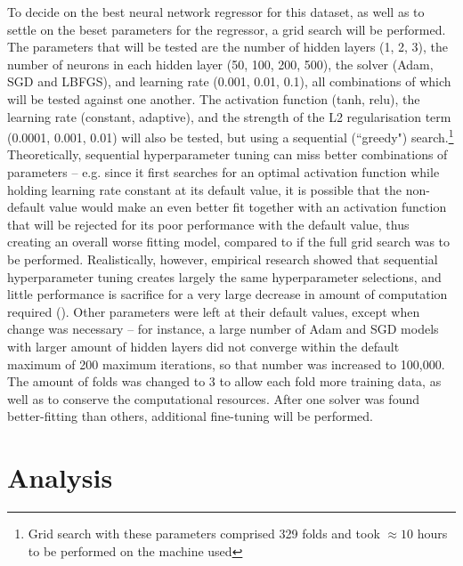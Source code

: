 \documentclass[12pt]{report}
\begin{document}
To decide on the best neural network regressor for this dataset, as well as to settle on the beset parameters for the regressor, a grid search will be performed. The parameters that will be tested are the number of hidden layers (1, 2, 3), the number of neurons in each hidden layer (50, 100, 200, 500), the solver (Adam, SGD and LBFGS), and learning rate (0.001, 0.01, 0.1), all combinations of which will be tested against one another. The activation function (tanh, relu), the learning rate (constant, adaptive), and the strength of the L2 regularisation term (0.0001, 0.001, 0.01) will also be tested, but using a sequential (``greedy") search.\footnote{Grid search with these parameters comprised 329 folds and took $\approx10$ hours to be performed on the machine used} Theoretically, sequential hyperparameter tuning can miss better combinations of parameters -- e.g. since it first searches for an optimal activation function while holding learning rate constant at its default value, it is possible that the non-default value would make an even better fit together with an activation function that will be rejected for its poor performance with the default value, thus creating an overall worse fitting model, compared to if the full grid search was to be performed. Realistically, however, empirical research showed that sequential hyperparameter tuning creates largely the same hyperparameter selections, and little performance is sacrifice for a very large decrease in amount of computation required (\cite{jin2022}). Other parameters were left at their default values, except when change was necessary -- for instance, a large number of Adam and SGD models with larger amount of hidden layers did not converge within the default maximum of 200 maximum iterations, so that number was increased to 100,000. The amount of folds was changed to 3 to allow each fold more training data, as well as to conserve the computational resources. After one solver was found better-fitting than others, additional fine-tuning will be performed.


\section{Analysis}
\end{document}
